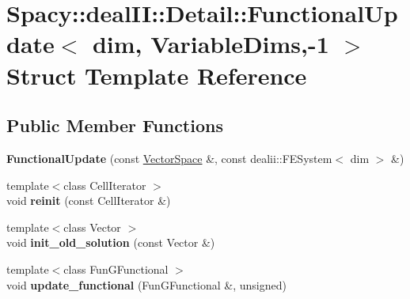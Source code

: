 \hypertarget{structSpacy_1_1dealII_1_1Detail_1_1FunctionalUpdate_3_01dim_00_01VariableDims_00-1_01_4}{\section{\-Spacy\-:\-:deal\-I\-I\-:\-:\-Detail\-:\-:\-Functional\-Update$<$ dim, \-Variable\-Dims,-\/1 $>$ \-Struct \-Template \-Reference}
\label{structSpacy_1_1dealII_1_1Detail_1_1FunctionalUpdate_3_01dim_00_01VariableDims_00-1_01_4}
}
\subsection*{\-Public \-Member \-Functions}
\begin{DoxyCompactItemize}
\item 
\hypertarget{structSpacy_1_1dealII_1_1Detail_1_1FunctionalUpdate_3_01dim_00_01VariableDims_00-1_01_4_ae7f013437fda0696ad3c981735075517}{{\bfseries \-Functional\-Update} (const \hyperlink{classSpacy_1_1VectorSpace}{\-Vector\-Space} \&, const dealii\-::\-F\-E\-System$<$ dim $>$ \&)}\label{structSpacy_1_1dealII_1_1Detail_1_1FunctionalUpdate_3_01dim_00_01VariableDims_00-1_01_4_ae7f013437fda0696ad3c981735075517}

\item 
\hypertarget{structSpacy_1_1dealII_1_1Detail_1_1FunctionalUpdate_3_01dim_00_01VariableDims_00-1_01_4_af881bed8138aa08f2d8e4a143b72d754}{{\footnotesize template$<$class Cell\-Iterator $>$ }\\void {\bfseries reinit} (const \-Cell\-Iterator \&)}\label{structSpacy_1_1dealII_1_1Detail_1_1FunctionalUpdate_3_01dim_00_01VariableDims_00-1_01_4_af881bed8138aa08f2d8e4a143b72d754}

\item 
\hypertarget{structSpacy_1_1dealII_1_1Detail_1_1FunctionalUpdate_3_01dim_00_01VariableDims_00-1_01_4_ab5215daf743ba2a2015682a908c798d3}{{\footnotesize template$<$class Vector $>$ }\\void {\bfseries init\-\_\-old\-\_\-solution} (const \-Vector \&)}\label{structSpacy_1_1dealII_1_1Detail_1_1FunctionalUpdate_3_01dim_00_01VariableDims_00-1_01_4_ab5215daf743ba2a2015682a908c798d3}

\item 
\hypertarget{structSpacy_1_1dealII_1_1Detail_1_1FunctionalUpdate_3_01dim_00_01VariableDims_00-1_01_4_a87697cd4d5aa227da5ca27a814793dc5}{{\footnotesize template$<$class Fun\-G\-Functional $>$ }\\void {\bfseries update\-\_\-functional} (\-Fun\-G\-Functional \&, unsigned)}\label{structSpacy_1_1dealII_1_1Detail_1_1FunctionalUpdate_3_01dim_00_01VariableDims_00-1_01_4_a87697cd4d5aa227da5ca27a814793dc5}

\end{DoxyCompactItemize}
